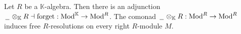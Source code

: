 \documentclass[../thesis.tex]{subfiles}
\begin{document}
        \begin{example}
            Let $R$ be a $\mathbb{K}$-algebra. Then there is an adjunction $\hspace{0.05cm}\underline{\hspace{0.2cm}}\hspace{0.05cm} \otimes_\mathbb{K}R \dashv \text{forget} : \text{Mod}^\mathbb{K} \rightarrow \text{Mod}^R$. The comonad $\hspace{0.05cm}\underline{\hspace{0.2cm}}\hspace{0.05cm} \otimes_\mathbb{K} R : \text{Mod}^R \rightarrow \text{Mod}^R$ induces free $R$-resolutions on every right $R$-module $M$. 
            \begin{center}
            \end{center}
        \end{example}
\end{document}
